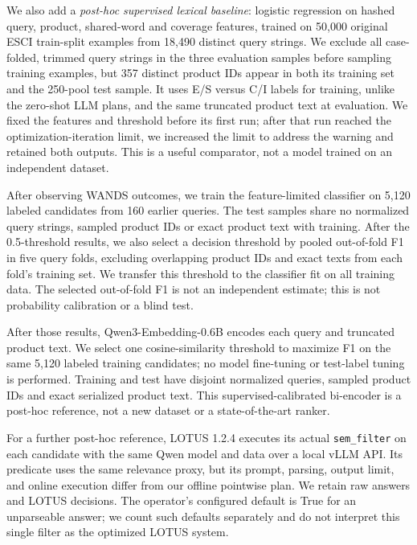 \documentclass[conference]{IEEEtran}
\begin{document}
We also add a \emph{post-hoc supervised lexical baseline}: logistic regression on hashed query, product, shared-word and coverage features, trained on 50,000 original ESCI train-split examples from 18,490 distinct query strings. We exclude all case-folded, trimmed query strings in the three evaluation samples before sampling training examples, but 357 distinct product IDs appear in both its training set and the 250-pool test sample. It uses E/S versus C/I labels for training, unlike the zero-shot LLM plans, and the same truncated product text at evaluation. We fixed the features and threshold before its first run; after that run reached the optimization-iteration limit, we increased the limit to address the warning and retained both outputs. This is a useful comparator, not a model trained on an independent dataset.

After observing WANDS outcomes, we train the feature-limited classifier on 5,120 labeled candidates from 160 earlier queries. The test samples share no normalized query strings, sampled product IDs or exact product text with training. After the 0.5-threshold results, we also select a decision threshold by pooled out-of-fold F1 in five query folds, excluding overlapping product IDs and exact texts from each fold's training set. We transfer this threshold to the classifier fit on all training data. The selected out-of-fold F1 is not an independent estimate; this is not probability calibration or a blind test.

After those results, Qwen3-Embedding-0.6B \cite{qwen_embed} encodes each query and truncated product text. We select one cosine-similarity threshold to maximize F1 on the same 5,120 labeled training candidates; no model fine-tuning or test-label tuning is performed. Training and test have disjoint normalized queries, sampled product IDs and exact serialized product text. This supervised-calibrated bi-encoder is a post-hoc reference, not a new dataset or a state-of-the-art ranker.

For a further post-hoc reference, LOTUS 1.2.4 executes its actual \texttt{sem\_filter} on each candidate with the same Qwen model and data over a local vLLM API. Its predicate uses the same relevance proxy, but its prompt, parsing, output limit, and online execution differ from our offline pointwise plan. We retain raw answers and LOTUS decisions. The operator's configured default is True for an unparseable answer; we count such defaults separately and do not interpret this single filter as the optimized LOTUS system.
\end{document}
